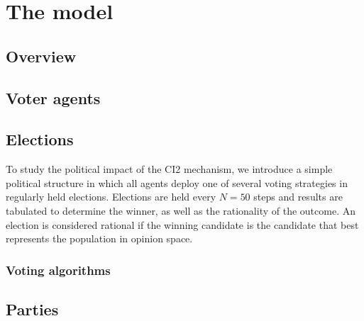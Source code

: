 \section{The model}
\label{sec:model}

\subsection{Overview}


\subsection{Voter agents}


\subsection{Elections}


To study the political impact of the CI2 mechanism, we introduce a simple political
structure in which all agents deploy one of several voting strategies in regularly held elections.
Elections are held every $N=50$ steps and results are tabulated to determine the winner, as well 
as the rationality of the outcome. An election is considered rational if the
winning candidate is the candidate that best represents the population
in opinion space.

\subsubsection{Voting algorithms}




\subsection{Parties}

